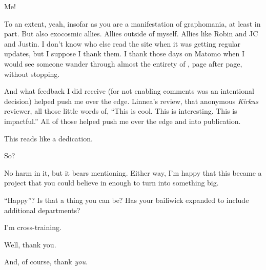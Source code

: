\begin{paracol}{2}
\begin{rightcolumn}
  \begin{ally}
    Me!
  \end{ally}
  To an extent, yeah, insofar as you are a manifestation of graphomania, at least in part. But also exocosmic allies. Allies outside of myself. Allies like Robin and JC and Justin. I don't know who else read the site when it was getting regular updates, but I suppose I thank them. I thank those days on Matomo when I would see someone wander through almost the entirety of \allyId, page after page, without stopping.

  And what feedback I did receive (for not enabling comments was an intentional decision) helped push me over the edge. Linnea's review, that anonymous \emph{Kirkus} reviewer, all those little words of, ``This is cool. This is interesting. This is impactful.'' All of those helped push me over the edge and into publication.

  \begin{ally}
    This reads like a dedication.
  \end{ally}
  So?

  \begin{ally}
    No harm in it, but it bears mentioning. Either way, I'm happy that this became a project that you could believe in enough to turn into something big.
  \end{ally}
  ``Happy''? Is that a thing you can be? Has your bailiwick expanded to include additional departments?

  \begin{ally}
    I'm cross-training.
  \end{ally}
  Well, thank you.
  \vfill

  \noindent And, of course, thank \emph{you}.
\end{rightcolumn}
\end{paracol}

